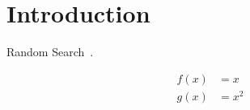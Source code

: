 \section{Introduction}
Random Search~\cite{bergstra2012random}.

\begin{equation}
\begin{aligned}
  f(x) &= x \\
  g(x) &= x^2
\end{aligned}
\label{main:introduction:eq:demo}
\end{equation}
